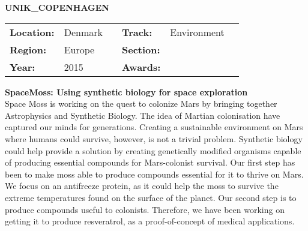 \textbf{\uppercase{UNIK\_Copenhagen}}
\FloatBarrier
\begin{table}[h]
\begin{tabular}{lp{2.5cm}llll}
\textbf{Location:} & Denmark & \multicolumn{1}{|l}{} & \textbf{Track:}   & Environment \\
\textbf{Region:}   & Europe   & \multicolumn{1}{|l}{} & \textbf{Section:} &  \\
\textbf{Year:}     & 2015   & \multicolumn{1}{|l}{} & \textbf{Awards:}  &
\end{tabular}
\end{table}
\FloatBarrier
\noindent	\textbf{SpaceMoss: Using synthetic biology for space exploration} \vspace{.2cm}\\
Space Moss is working on the quest to colonize Mars by bringing together Astrophysics and Synthetic Biology.
The idea of Martian colonisation have captured our minds for generations. Creating a sustainable environment on Mars where humans could survive, however, is not a trivial problem. Synthetic biology could help provide a solution by creating genetically modified organisms capable of producing essential compounds for Mars-colonist survival. 
Our first step has been to make moss able to produce compounds essential for it to thrive on Mars.
We focus on an antifreeze protein, as it could help the moss to survive the extreme temperatures found on the surface of the planet.
Our second step is to produce compounds useful to colonists. Therefore, we have been working on getting it to produce resveratrol, as a proof-of-concept of medical applications.
\vspace{2cm} $ $
\pagebreak

